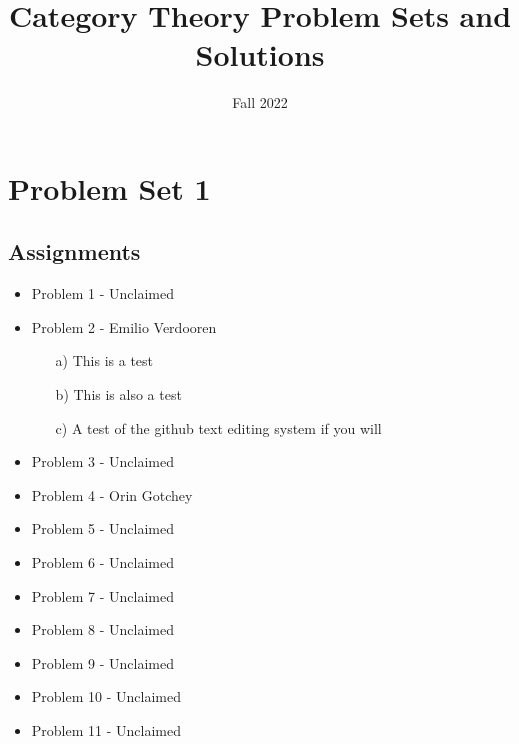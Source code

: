 \documentclass{article}
\title{Category Theory Problem Sets and Solutions}
\author{Fall 2022}
\begin{document}
\maketitle
\tableofcontents
\newpage
\section{Problem Set 1}
\subsection{Assignments}
\begin{itemize}
    \item Problem 1 - Unclaimed
    \item Problem 2 - Emilio Verdooren
        \begin{itemize}
        \item[a)] This is a test
        \item[b)] This is also a test
        \item[c)] A test of the github text editing system if you will
        \end{itemize}
    \item Problem 3 - Unclaimed
    \item Problem 4 - Orin Gotchey
    \item Problem 5 - Unclaimed
    \item Problem 6 - Unclaimed
    \item Problem 7 - Unclaimed
    \item Problem 8 - Unclaimed
    \item Problem 9 - Unclaimed
    \item Problem 10 - Unclaimed
    \item Problem 11 - Unclaimed
\end{itemize}
\end{document}
